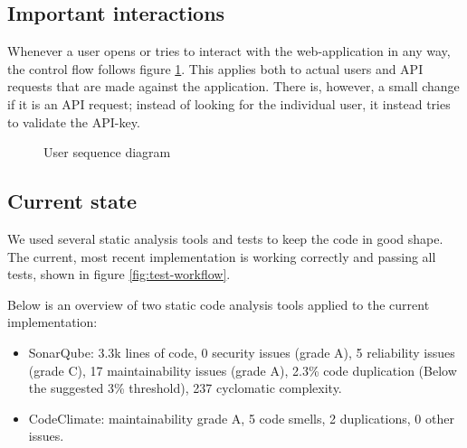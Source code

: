 \subsection{Important interactions} %



Whenever a user opens or tries to interact with the web-application in any way, the control flow follows figure \ref{fig:user-seq}. This applies both to actual users and API requests that are made against the application. There is, however, a small change if it is an API request; instead of looking for the individual user, it instead tries to validate the API-key.

\begin{figure}[h!]
  \centering
  
  \caption{User sequence diagram}
  \label{fig:user-seq}
\end{figure}


\subsection{Current state} %
We used several static analysis tools and tests to keep the
code in good shape. The current, most recent implementation
is working correctly and passing all tests, shown in figure \ref{fig:test-workflow}.

Below is an overview of two static code analysis tools applied to the current implementation:
\begin{itemize}
    \item SonarQube: 3.3k lines of code, 0 security issues (grade A), 5 reliability issues
    (grade C), 17 maintainability issues (grade A), 2.3\% code duplication
    (Below the suggested 3\% threshold), 237 cyclomatic complexity.
    \item CodeClimate: maintainability grade A, 5 code smells, 2 duplications,
    0 other issues.
\end{itemize}

